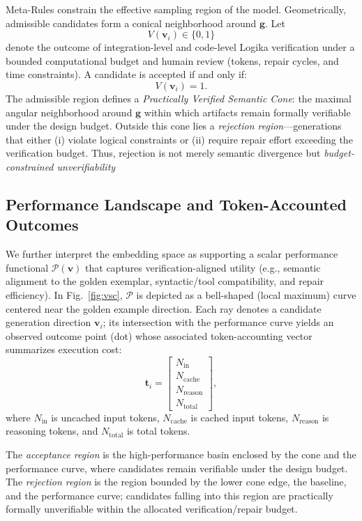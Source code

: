 \documentclass[conference]{IEEEtran}
\begin{document}
Meta-Rules constrain the effective sampling region of the model. Geometrically, admissible candidates form a conical neighborhood around $\mathbf{g}$. Let
\[
V(\mathbf{v}_i)\in\{0,1\}
\]
denote the outcome of integration-level and code-level Logika verification under a bounded computational budget and humain review (tokens, repair cycles, and time constraints). A candidate is accepted if and only if:
\begin{equation}
V(\mathbf{v}_i)=1.
\end{equation}
The admissible region defines a \emph{Practically Verified Semantic Cone}: the maximal angular neighborhood around $\mathbf{g}$ within which artifacts remain formally verifiable under the design budget. Outside this cone lies a \emph{rejection region}---generations that either (i) violate logical constraints or (ii) require repair effort exceeding the verification budget. Thus, rejection is not merely semantic divergence but \emph{budget-constrained unverifiability} %

\subsection{Performance Landscape and Token-Accounted Outcomes}

We further interpret the embedding space as supporting a scalar performance functional $\mathcal{P}(\mathbf{v})$ that captures verification-aligned utility (e.g., semantic alignment to the golden exemplar, syntactic/tool compatibility, and repair efficiency). In Fig.~\ref{fig:vsc}, $\mathcal{P}$ is depicted as a bell-shaped (local maximum) curve centered near the golden example direction. Each ray denotes a candidate generation direction $\mathbf{v}_i$; its intersection with the performance curve yields an observed outcome point (dot) whose associated token-accounting vector summarizes execution cost:
\[
\mathbf{t}_i =
\begin{bmatrix}
N_{\mathrm{in}} \\
N_{\mathrm{cache}} \\
N_{\mathrm{reason}} \\
N_{\mathrm{total}}
\end{bmatrix},
\]
where $N_{\mathrm{in}}$ is uncached input tokens, $N_{\mathrm{cache}}$ is cached input tokens, $N_{\mathrm{reason}}$ is reasoning tokens, and $N_{\mathrm{total}}$ is total tokens.

The \emph{acceptance region} is the high-performance basin enclosed by the cone and the performance curve, where candidates remain verifiable under the design budget. The \emph{rejection region} is the region bounded by the lower cone edge, the baseline, and the performance curve; candidates falling into this region are practically formally unverifiable within the allocated verification/repair budget.
\end{document}
